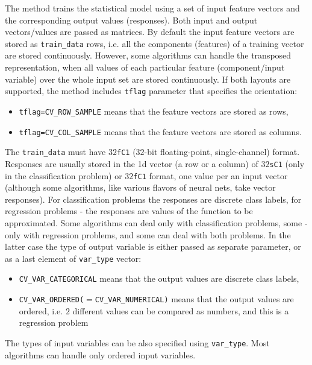 The method trains the statistical model using a set of input feature vectors and the corresponding output values (responses). Both input and output vectors/values are passed as matrices. By default the input feature vectors are stored as \texttt{train\_data} rows, i.e. all the components (features) of a training vector are stored continuously. However, some algorithms can handle the transposed representation, when all values of each particular feature (component/input variable) over the whole input set are stored continuously. If both layouts are supported, the method includes \texttt{tflag} parameter that specifies the orientation:
\begin{itemize}
 \item \texttt{tflag=CV\_ROW\_SAMPLE} means that the feature vectors are stored as rows,
 \item \texttt{tflag=CV\_COL\_SAMPLE} means that the feature vectors are stored as columns.
\end{itemize}
The \texttt{train\_data} must have \texttt{$32$fC1} ($32$-bit floating-point, single-channel) format. Responses are usually stored in the 1d vector (a row or a column) of \texttt{$32$sC1} (only in the classification problem) or \texttt{$32$fC1} format, one value per an input vector (although some algorithms, like various flavors of neural nets, take vector responses).
\newline
\newline
For classification problems the responses are discrete class labels, for regression problems - the responses are values of the function to be approximated. Some algorithms can deal only with classification problems, some - only with regression problems, and some can deal with both problems. In the latter case the type of output variable is either passed as separate parameter, or as a last element of \texttt{var\_type} vector:
\begin{itemize}
 \item \texttt{CV\_VAR\_CATEGORICAL} means that the output values are discrete class labels,
 \item \texttt{CV\_VAR\_ORDERED($=$CV\_VAR\_NUMERICAL)} means that the output values are ordered, i.e. $2$ different values can be compared as numbers, and this is a regression problem
\end{itemize}
The types of input variables can be also specified using \texttt{var\_type}. Most algorithms can handle only ordered input variables.
\newline
\newline
